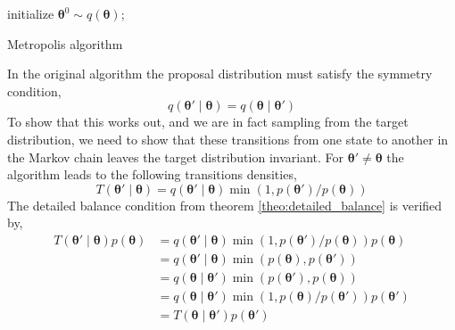 \begin{algorithm}[H]\label{algo_2}
\SetAlgoLined
initialize $\boldsymbol{\theta}^0\sim q(\boldsymbol{\theta})$;

\caption{Metropolis algorithm}
\end{algorithm}
In the original algorithm the proposal distribution must satisfy the symmetry condition,
\begin{equation*}
    q(\boldsymbol{\theta'}\mid \boldsymbol{\theta})=q(\boldsymbol{\theta}\mid \boldsymbol{\theta'})
\end{equation*}
To show that this works out, and we are in fact sampling from the target distribution, we need to show that these transitions from one state to another in the Markov chain leaves the target distribution invariant. For $\boldsymbol{\theta'}\neq \boldsymbol{\theta}$ the algorithm leads to the following transitions densities,
\begin{equation*}
    T\left(\boldsymbol{\theta}' \mid \boldsymbol{\theta}\right)=q\left(\boldsymbol{\theta}' \mid \boldsymbol{\theta}\right) \min \left(1, p\left(\boldsymbol{\theta}'\right) / p(\boldsymbol{\theta})\right)
\end{equation*}
The detailed balance condition from theorem \ref{theo:detailed_balance} is verified by,
\begin{equation*}
\begin{aligned}
T\left(\boldsymbol{\theta}' \mid \boldsymbol{\theta}\right) p(\boldsymbol{\theta}) &=q\left(\boldsymbol{\theta}' \mid \boldsymbol{\theta}\right) \min \left(1, p\left(\boldsymbol{\theta}'\right) / p(\boldsymbol{\theta})\right) p(\boldsymbol{\theta}) \\
&=q\left(\boldsymbol{\theta}' \mid \boldsymbol{\theta}\right) \min \left(p(\boldsymbol{\theta}), p\left(\boldsymbol{\theta}'\right)\right) \\
&=q\left(\boldsymbol{\theta} \mid \boldsymbol{\theta}'\right) \min \left(p\left(\boldsymbol{\theta}'\right), p(\boldsymbol{\theta})\right) \\
&=q\left(\boldsymbol{\theta} \mid \boldsymbol{\theta}'\right) \min \left(1, p(\boldsymbol{\theta}) / p\left(\boldsymbol{\theta}'\right)\right) p\left(\boldsymbol{\theta}'\right) \\
&=T\left(\boldsymbol{\theta} \mid \boldsymbol{\theta}'\right) p\left(\boldsymbol{\theta}'\right)
\end{aligned}
\end{equation*}
